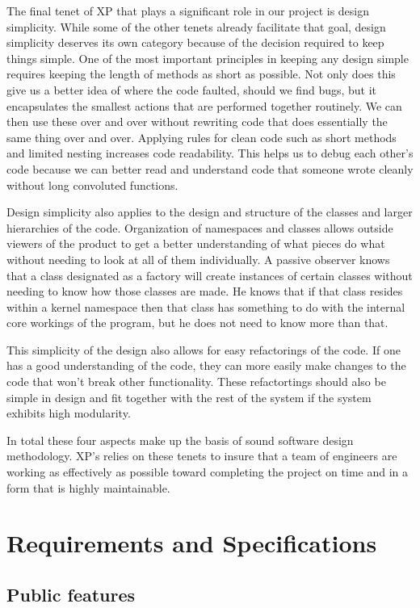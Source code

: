 \documentclass[12pt]{article}
\begin{document}
The final tenet of XP that plays a significant role in our project is design simplicity. While some of the other tenets already facilitate that goal, design simplicity deserves its own category because of the decision required to keep things simple. One of the most important principles in keeping any design simple requires keeping the length of methods as short as possible. Not only does this give us a better idea of where the code faulted, should we find bugs, but it encapsulates the smallest actions that are performed together routinely. We can then use these over and over without rewriting code that does essentially the same thing over and over. Applying rules for clean code such as short methods and limited nesting increases code readability. This helps us to debug each other's code because we can better read and understand code that someone wrote cleanly without long convoluted functions. 

Design simplicity also applies to the design and structure of the classes and larger hierarchies of the code. Organization of namespaces and classes allows outside viewers of the product to get a better understanding of what pieces do what without needing to look at all of them individually. A passive observer knows that a class designated as a factory will create instances of certain classes without needing to know how those classes are made. He knows that if that class resides within a kernel namespace then that class has something to do with the internal core workings of the program, but he does not need to know more than that. 

This simplicity of the design also allows for easy refactorings of the code. If one has a good understanding of the code, they can more easily make changes to the code that won't break other functionality. These refactortings should also be simple in design and fit together with the rest of the system if the system exhibits high modularity.

In total these four aspects make up the basis of sound software design methodology. XP's relies on these tenets to insure that a team of engineers are working as effectively as possible toward completing the project on time and in a form that is highly maintainable.

\newpage
\section{Requirements and Specifications}
\subsection{Public features}
\end{document}
